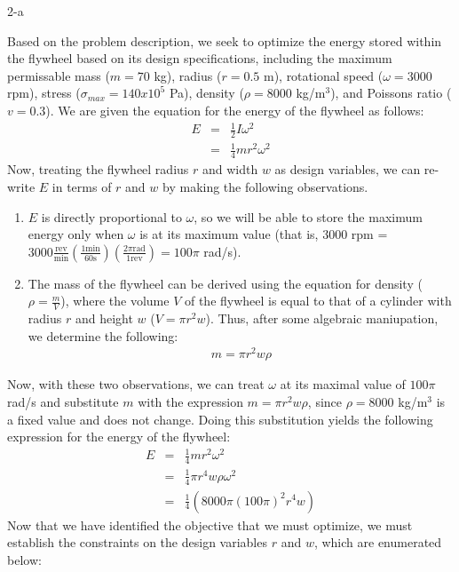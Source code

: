 \documentclass[11pt]{article}
\begin{document}
\begin{problem}{2-a}
\end{problem}
\begin{solution}

Based on the problem description, we seek to optimize the energy stored within the flywheel based on its design specifications, including the maximum permissable mass ($m = 70$ kg), radius ($r = 0.5$ m), rotational speed ($\omega = 3000$ rpm), stress ($\sigma_{max} = 140 x 10^5$ Pa), density ($\rho = 8000$ kg/m$^3$), and Poissons ratio ($v = 0.3$). We are given the equation for the energy of the flywheel as follows:
\begin{eqnarray*}
E & = & \frac{1}{2}I\omega^2 \\
& = & \frac{1}{4}mr^2\omega^2
\end{eqnarray*}
Now, treating the flywheel radius $r$ and width $w$ as design variables, we can re-write $E$ in terms of $r$ and $w$ by making the following observations.
\begin{enumerate}
	\item $E$ is directly proportional to $\omega$, so we will be able to store the maximum energy only when $\omega$ is at its maximum value (that is, $3000$ rpm = $3000\frac{\text{rev}}{\text{min}}(\frac{1\text{min}}{60\text{s}})(\frac{2\pi \text{rad}}{1 \text{rev}}) = 100\pi$ rad/s).
	\item The mass of the flywheel can be derived using the equation for density ($\rho = \frac{m}{V}$), where the volume $V$ of the flywheel is equal to that of a cylinder with radius $r$ and height $w$ ($V = \pi r^2 w$). Thus, after some algebraic maniupation, we determine the following:
\begin{eqnarray*}
m = \pi r^2 w \rho
\end{eqnarray*} 
\end{enumerate}
Now, with these two observations, we can treat $\omega$ at its maximal value of $100\pi$ rad/s and substitute $m$ with the expression $m = \pi r^2 w \rho$, since $\rho = 8000$ kg/m$^3$ is a fixed value and does not change. Doing this substitution yields the following expression for the energy of the flywheel:
\begin{eqnarray*}
E & = & \frac{1}{4}mr^2\omega^2 \\
& = &\frac{1}{4}\pi r^4 w \rho \omega^2 \\
& = & \frac{1}{4}(8000\pi(100\pi)^2r^4 w) 
\end{eqnarray*}
Now that we have identified the objective that we must optimize, we must establish the constraints on the design variables $r$ and $w$, which are enumerated below:

\end{solution}
\end{document}
